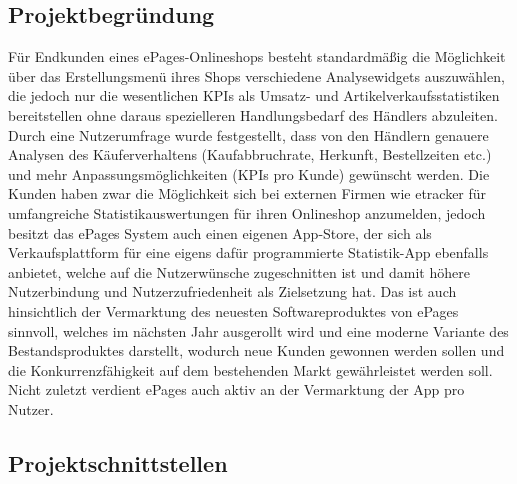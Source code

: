 \subsection{Projektbegründung} 
\label{sec:Projektbegruendung}

Für Endkunden eines ePages-Onlineshops besteht standardmäßig die Möglichkeit über das Erstellungsmenü ihres Shops verschiedene Analysewidgets auszuwählen, die jedoch nur die wesentlichen KPIs als Umsatz- und Artikelverkaufsstatistiken bereitstellen ohne daraus spezielleren Handlungsbedarf des Händlers abzuleiten. Durch eine Nutzerumfrage wurde festgestellt, dass von den Händlern genauere Analysen des Käuferverhaltens (Kaufabbruchrate, Herkunft, Bestellzeiten etc.) und mehr Anpassungsmöglichkeiten (KPIs pro Kunde) gewünscht werden. Die Kunden haben zwar die Möglichkeit sich bei externen Firmen wie etracker für umfangreiche Statistikauswertungen für ihren Onlineshop anzumelden, jedoch besitzt das ePages System auch einen eigenen App-Store, der sich als Verkaufsplattform für eine eigens dafür programmierte Statistik-App ebenfalls anbietet, welche auf die Nutzerwünsche zugeschnitten ist und damit höhere Nutzerbindung und Nutzerzufriedenheit als Zielsetzung hat. Das ist auch hinsichtlich der Vermarktung des neuesten Softwareproduktes von ePages sinnvoll, welches im nächsten Jahr ausgerollt wird und eine moderne Variante des Bestandsproduktes darstellt, wodurch neue Kunden gewonnen werden sollen und die Konkurrenzfähigkeit auf dem bestehenden Markt gewährleistet werden soll. Nicht zuletzt verdient ePages auch aktiv an der Vermarktung der App pro Nutzer.


\subsection{Projektschnittstellen} 
\label{sec:Projektschnittstellen}

